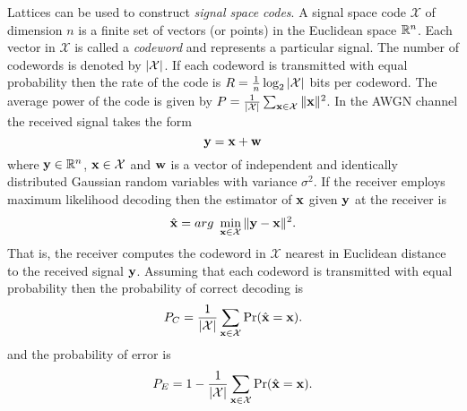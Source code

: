 \documentclass[draftcls, onecolumn, 11pt]{IEEEtran}
\begin{document}
\newcommand{\calX}{\mathcal X}
Lattices can be used to construct \emph{signal space codes}.  A signal space code $\calX$ of dimension $n$ is a finite set of vectors (or points) in the Euclidean space ${\mathbb R}^n$.  Each vector in $\calX$ is called a \emph{codeword} and represents a particular signal.  The number of codewords is denoted by $\abs{\calX}$.  If each codeword is transmitted with equal probability then the rate of the code is $R = \frac{1}{n}\log_2\abs{\calX}$ bits per codeword. The average power of the code is given by $P = \frac{1}{\abs{\calX}}\sum_{\xbf \in \calX}\|\xbf\|^2$.  In the AWGN channel the received signal takes the form
\[
\mathbf{y} = \mathbf{x} + \mathbf{w}
\]
where $\mathbf{y} \in {\mathbb R}^n$, $\xbf \in \calX$ and $\mathbf{w}$ is a vector of independent and identically distributed Gaussian random variables with variance $\sigma^2$.  If the receiver employs maximum likelihood decoding then the estimator of $\mathbf{x}$ given $\mathbf{y}$ at the receiver is
\begin{equation}\label{eq:mldecoder}
\hat{\xbf} = \mbox{arg~}\min_{\xbf \in \calX} \| \ybf - \xbf \|^2.
\end{equation}
That is, the receiver computes the codeword in $\calX$ nearest in Euclidean distance to the received signal $\mathbf{y}$.  Assuming that each codeword is transmitted with equal probability then the probability of correct decoding is
\[
P_C =\frac{1}{\abs{\calX}}\sum_{\xbf \in \calX} \prob( \hat{\xbf} = \xbf ).
\]
and the probability of error is
\[
P_E = 1 - \frac{1}{\abs{\calX}} \sum_{\xbf \in \calX} \prob(
\hat{\xbf} = \xbf ).
\]
\end{document}
